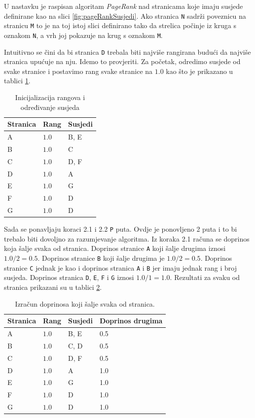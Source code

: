 \documentclass[times, utf8, zavrsni, numeric]{fer}
\begin{document}
U nastavku je raspisan algoritam \emph{PageRank} nad stranicama koje imaju susjede definirane kao na slici \ref{fig:pageRankSusjedi}. Ako stranica \texttt{N} sadrži poveznicu na stranicu \texttt{M} to je na toj istoj slici definirano tako da strelica počinje iz kruga s oznakom \texttt{N}, a vrh joj pokazuje na krug s oznakom \texttt{M}.

Intuitivno se čini da bi stranica \texttt{D} trebala biti najviše rangirana budući da najviše stranica upućuje na nju. Idemo to provjeriti. Za početak, odredimo susjede od svake stranice i postavimo rang svake stranice na $1.0$ kao što je prikazano u tablici \ref{tbl:pageRankKorak1}.
\pagebreak
\begin{table}[htb]
\caption{Inicijalizacija rangova i određivanje susjeda}
\label{tbl:pageRankKorak1}
\centering
\begin{tabular}{lll} 
\hline
Stranica & Rang & Susjedi \\
\hline
A & $1.0$ & B, E\\
B & $1.0$ & C\\
C & $1.0$ & D, F\\
D & $1.0$ & A\\
E & $1.0$ & G\\
F & $1.0$ & D\\
G & $1.0$ & D\\
\hline
\end{tabular}
\end{table}

Sada se ponavljaju koraci 2.1 i 2.2 \texttt{P} puta. Ovdje je ponovljeno 2 puta i to bi trebalo biti dovoljno za razumjevanje algoritma.
Iz koraka 2.1 računa se doprinos koja šalje svaka od stranica. Doprinos stranice \texttt{A} koji šalje drugima iznosi $1.0 / 2 = 0.5$. Doprinos stranice \texttt{B} koji šalje drugima je $1.0 / 2 = 0.5$. Doprinos stranice \texttt{C} jednak je kao i doprinos stranica \texttt{A} i \texttt{B} jer imaju jednak rang i broj susjeda. Doprinos stranica \texttt{D}, \texttt{E}, \texttt{F} i \texttt{G} iznosi $1.0 / 1 = 1.0$. Rezultati za svaku od stranica prikazani su u tablici \ref{tbl:pageRankKorak21p1}.

\begin{table}[htb]
\caption{Izračun doprinosa koji šalje svaka od stranica.}
\label{tbl:pageRankKorak21p1}
\centering
\begin{tabular}{llll} 
\hline
Stranica & Rang & Susjedi & Doprinos drugima\\
\hline
A & $1.0$ & B, E & 0.5\\
B & $1.0$ & C, D & 0.5\\
C & $1.0$ & D, F & 0.5\\
D & $1.0$ & A & 1.0\\
E & $1.0$ & G & 1.0\\
F & $1.0$ & D & 1.0\\
G & $1.0$ & D & 1.0\\
\hline
\end{tabular}
\end{table}
\end{document}
